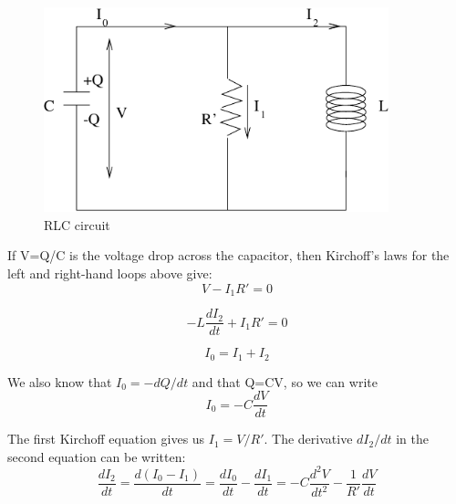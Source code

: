 \documentclass[makesolutionspdf]{esg8022pset}
\begin{document}
\begin{solution}

\begin{figure}[H]
    \centering
    \includegraphics[width = 10cm]{ps8}
    \caption{RLC circuit}
    \label{fig:graph22.eps}
  \end{figure}


If V=Q/C is the voltage drop across the capacitor, then Kirchoff's
laws for the left and right-hand loops above give:
\begin{equation}
V-I_1R'=0
\end{equation}

\begin{equation}
-L\frac{dI_2}{dt}+I_1R'=0
\end{equation}

\begin{equation}
I_0=I_1+I_2
\end{equation}

We also know that $I_0=-dQ/dt$ and that Q=CV, so we can write
\begin{equation}
I_0=-C\frac{dV}{dt}
\end{equation}

The first Kirchoff equation gives us $I_1=V/R'$. The derivative
$dI_2/dt$ in the second equation can be written:
\begin{equation}
\frac{dI_2}{dt}=\frac{d(I_0-I_1)}{dt}=\frac{dI_0}{dt}-\frac{dI_1}{dt}=-C\frac{d^2V}{dt^2}-\frac{1}{R'}\frac{dV}{dt}
\end{equation}


\end{solution}
\end{document}
